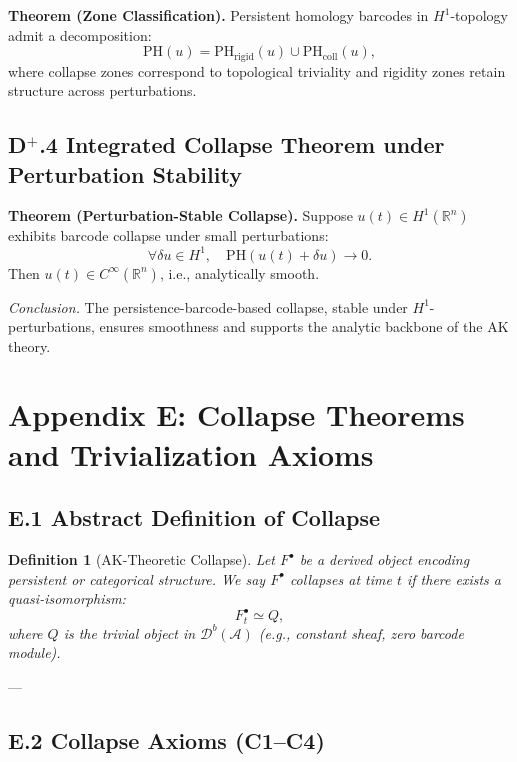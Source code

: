\documentclass[11pt]{article}
\newtheorem{definition}[theorem]{Definition}
\begin{document}
\textbf{Theorem (Zone Classification).}  
Persistent homology barcodes in \( H^1 \)-topology admit a decomposition:
\[
\mathrm{PH}(u) = \mathrm{PH}_{\text{rigid}}(u) \cup \mathrm{PH}_{\text{coll}}(u),
\]
where collapse zones correspond to topological triviality and rigidity zones retain structure across perturbations.

\subsection*{D$^+$.4 Integrated Collapse Theorem under Perturbation Stability}
\textbf{Theorem (Perturbation-Stable Collapse).}  
Suppose \( u(t) \in H^1(\mathbb{R}^n) \) exhibits barcode collapse under small perturbations:
\[
\forall \delta u \in H^1, \quad \mathrm{PH}(u(t) + \delta u) \to 0.
\]
Then \( u(t) \in C^\infty(\mathbb{R}^n) \), i.e., analytically smooth.

\textit{Conclusion.}  
The persistence-barcode-based collapse, stable under \( H^1 \)-perturbations, ensures smoothness and supports the analytic backbone of the AK theory.




\section*{Appendix E: Collapse Theorems and Trivialization Axioms}

\subsection*{E.1 Abstract Definition of Collapse}

\begin{definition}[AK-Theoretic Collapse]
Let $F^\bullet$ be a derived object encoding persistent or categorical structure.  
We say $F^\bullet$ \emph{collapses} at time $t$ if there exists a quasi-isomorphism:
\[
F^\bullet_t \simeq Q,
\]
where $Q$ is the trivial object in $\mathcal{D}^b(\mathcal{A})$ (e.g., constant sheaf, zero barcode module).
\end{definition}

---

\subsection*{E.2 Collapse Axioms (C1–C4)}
\end{document}

